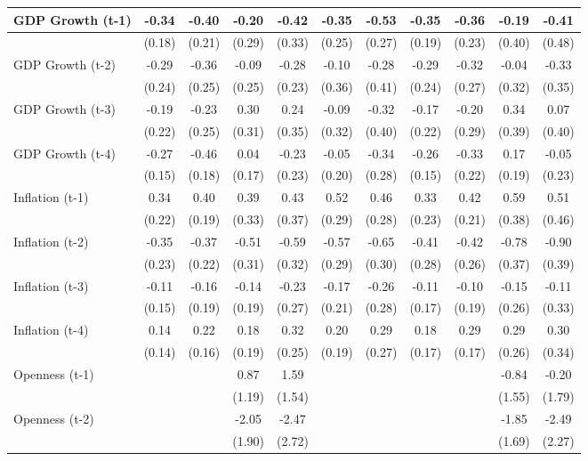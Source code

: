 \begin{tabular}{lcccccccccc}
\toprule
GDP Growth (t-1) & -0.34 & -0.40 & -0.20 & -0.42 & -0.35 & -0.53 & -0.35 & -0.36 & -0.19 & -0.41 \\
\midrule
& (0.18) & (0.21) & (0.29) & (0.33) & (0.25) & (0.27) & (0.19) & (0.23) & (0.40) & (0.48) \\
GDP Growth (t-2) & -0.29 & -0.36 & -0.09 & -0.28 & -0.10 & -0.28 & -0.29 & -0.32 & -0.04 & -0.33 \\
& (0.24) & (0.25) & (0.25) & (0.23) & (0.36) & (0.41) & (0.24) & (0.27) & (0.32) & (0.35) \\
GDP Growth (t-3) & -0.19 & -0.23 & 0.30 & 0.24 & -0.09 & -0.32 & -0.17 & -0.20 & 0.34 & 0.07 \\
& (0.22) & (0.25) & (0.31) & (0.35) & (0.32) & (0.40) & (0.22) & (0.29) & (0.39) & (0.40) \\
GDP Growth (t-4) & -0.27 & -0.46 & 0.04 & -0.23 & -0.05 & -0.34 & -0.26 & -0.33 & 0.17 & -0.05 \\
& (0.15) & (0.18) & (0.17) & (0.23) & (0.20) & (0.28) & (0.15) & (0.22) & (0.19) & (0.23) \\
Inflation (t-1) & 0.34 & 0.40 & 0.39 & 0.43 & 0.52 & 0.46 & 0.33 & 0.42 & 0.59 & 0.51 \\
& (0.22) & (0.19) & (0.33) & (0.37) & (0.29) & (0.28) & (0.23) & (0.21) & (0.38) & (0.46) \\
Inflation (t-2) & -0.35 & -0.37 & -0.51 & -0.59 & -0.57 & -0.65 & -0.41 & -0.42 & -0.78 & -0.90 \\
& (0.23) & (0.22) & (0.31) & (0.32) & (0.29) & (0.30) & (0.28) & (0.26) & (0.37) & (0.39) \\
Inflation (t-3) & -0.11 & -0.16 & -0.14 & -0.23 & -0.17 & -0.26 & -0.11 & -0.10 & -0.15 & -0.11 \\
& (0.15) & (0.19) & (0.19) & (0.27) & (0.21) & (0.28) & (0.17) & (0.19) & (0.26) & (0.33) \\
Inflation (t-4) & 0.14 & 0.22 & 0.18 & 0.32 & 0.20 & 0.29 & 0.18 & 0.29 & 0.29 & 0.30 \\
& (0.14) & (0.16) & (0.19) & (0.25) & (0.19) & (0.27) & (0.17) & (0.17) & (0.26) & (0.34) \\
Openness (t-1) &  &  & 0.87 & 1.59 &  &  &  &  & -0.84 & -0.20 \\
&  &  & (1.19) & (1.54) &  &  &  &  & (1.55) & (1.79) \\
Openness (t-2) &  &  & -2.05 & -2.47 &  &  &  &  & -1.85 & -2.49 \\
&  &  & (1.90) & (2.72) &  &  &  &  & (1.69) & (2.27) \\

\end{tabular}
